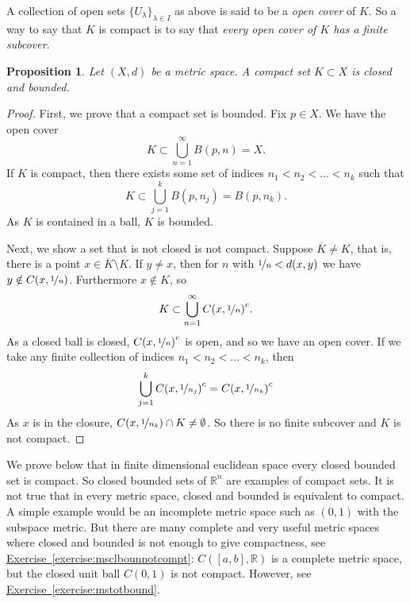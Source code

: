 \documentclass[12pt]{book}
\newcommand{\R}{{\mathbb{R}}}
\newcommand{\myindex}[1]{#1\index{#1}}
\theoremstyle{plain}
\newtheorem{prop}[thm]{Proposition}
\theoremstyle{remark}
\theoremstyle{definition}
\theoremstyle{exercise}
\theoremstyle{example}
\newcommand{\exerciseref}[1]{\hyperref[#1]{Exercise~\ref*{#1}}}
\begin{document}
A collection of open sets $\{ U_{\lambda} \}_{\lambda \in I}$ as above is
said to be a \emph{\myindex{open cover}} of $K$.  So a way to say that
$K$ is compact is to say that \emph{every open cover of $K$ has a finite
\myindex{subcover}}.

\begin{prop}
Let $(X,d)$ be a metric space.  A compact set $K \subset X$ is closed and
bounded.
\end{prop}

\begin{proof}
First, we prove that a compact set is bounded.
Fix $p \in X$.  We have the open cover
\begin{equation*}
K \subset \bigcup_{n=1}^\infty B(p,n) = X .
\end{equation*}
If $K$ is compact, then there exists some set of indices
$n_1 < n_2 < \ldots < n_k$ such that
\begin{equation*}
K \subset \bigcup_{j=1}^k B(p,n_j) = B(p,n_k) .
\end{equation*}
As $K$ is contained in a ball, $K$ is bounded.

Next, we show a set that is not closed is not compact.  Suppose 
$\overline{K} \not= K$, that is, there is a point $x \in \overline{K}
\setminus K$.
If $y \not= x$, then for $n$
with $\nicefrac{1}{n} < d(x,y)$ we have
$y \notin C(x,\nicefrac{1}{n})$. Furthermore $x \notin K$, so
\begin{equation*}
K \subset \bigcup_{n=1}^\infty {C(x,\nicefrac{1}{n})}^c .
\end{equation*}
As a closed ball is closed, ${C(x,\nicefrac{1}{n})}^c$ is open, and
so we have an open cover.
If we take any
finite collection of indices $n_1 < n_2 < \ldots < n_k$, then 
\begin{equation*}
\bigcup_{j=1}^k {C(x,\nicefrac{1}{n_j})}^c 
=
{C(x,\nicefrac{1}{n_k})}^c 
\end{equation*}
As $x$ is in the closure,
$C(x,\nicefrac{1}{n_k}) \cap K \not= \emptyset$.  So there is no
finite subcover and $K$ is not compact.
\end{proof}

We prove below that 
in finite dimensional euclidean space
every closed bounded set is compact.
So closed bounded sets
of $\R^n$ are examples of compact sets.
It is not true that in every metric space, closed and bounded is equivalent
to compact.  A simple example would be an incomplete metric space such as
$(0,1)$ with the subspace metric.
But there are many complete and very useful metric spaces where closed and bounded is not
enough to give compactness, see
\exerciseref{exercise:msclbounnotcompt}: $C([a,b],\R)$ is a complete metric
space, but the closed unit ball $C(0,1)$ is not compact.  However, see
\exerciseref{exercise:mstotbound}.
\end{document}
